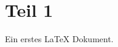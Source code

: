 \documentclass[ngerman]{scrartcl}
\begin{document}
\section{Teil 1}         

Ein erstes \LaTeX{} Dokument.
\end{document}
